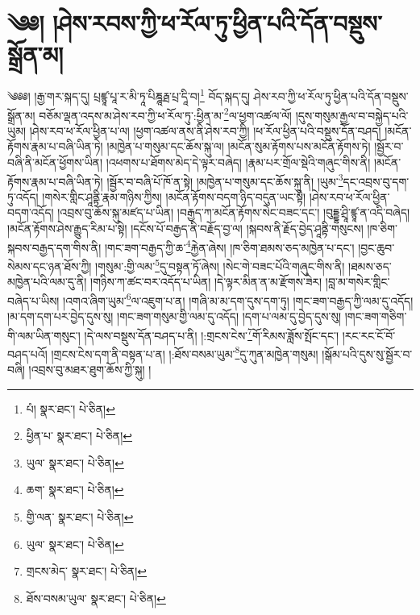 \setcounter{footnote}{0} 
\chapter{༄༅། །ཤེས་རབས་ཀྱི་ཕ་རོལ་ཏུ་ཕྱིན་པའི་དོན་བསྡུས་སྒྲོན་མ།}༄༅༅། །རྒྱ་གར་སྐད་དུ། པྲཛྙཱ་པཱ་ར་མི་ཏཱ་པིཎྜཱརྠ་པྲ་དཱི་བ།\footnote{པཾ།  སྣར་ཐང་།  པེ་ཅིན། } བོད་སྐད་དུ། ཤེས་རབ་ཀྱི་ཕ་རོལ་ཏུ་ཕྱིན་པའི་དོན་བསྡུས་སྒྲོན་མ། བཅོམ་ལྡན་འདས་མ་ཤེས་རབ་ཀྱི་ཕ་རོལ་ཏུ་:ཕྱིན་མ་\footnote{ཕྱིན་པ་  སྣར་ཐང་།  པེ་ཅིན། }ལ་ཕྱག་འཚལ་ལོ། །དུས་གསུམ་རྒྱལ་བ་བསྐྱེད་པའི་ཡུམ། །ཤེས་རབ་ཕ་རོལ་ཕྱིན་པ་ལ། །ཕྱག་འཚལ་ནས་ནི་ཤེས་རབ་ཀྱི། །ཕ་རོལ་ཕྱིན་པའི་བསྡུས་དོན་བཤད། །མངོན་རྟོགས་རྣམ་པ་བཞི་ཡིན་ཏེ། །མཁྱེན་པ་གསུམ་དང་ཆོས་སྐུ་ལ། །མངོན་སུམ་རྟོགས་པས་མངོན་རྟོགས་ཏེ། །སྦྱོར་བ་བཞི་ནི་མངོན་ཕྱོགས་ཡིན། །འཕགས་པ་ཐོགས་མེད་དེ་ལྟར་བཞེད། །རྣམ་པར་གྲོལ་སྡེའི་གཞུང་གིས་ནི། །མངོན་རྟོགས་རྣམ་པ་བཞི་ཡིན་ཏེ། །སྦྱོར་བ་བཞི་པོ་ཁོ་ན་སྟེ། །མཁྱེན་པ་གསུམ་དང་ཆོས་སྐུ་ནི། །ཡུམ་\footnote{ཡུལ་  སྣར་ཐང་།  པེ་ཅིན། }དང་འབྲས་བུ་དག་ཏུ་འདོད། །གསེར་གླིང་ཤཱནྟི་རྣམ་གཉིས་ཀྱིས། །མངོན་རྟོགས་བདག་ཉིད་བདུན་ཡང་སྟེ། །ཤེས་རབ་ཕ་རོལ་ཕྱིན་བདག་འདོད། །འབྲས་བུ་ཆོས་སྐུ་མཛད་པ་ཡིན། །བརྒྱད་ཀ་མངོན་རྟོགས་སེང་བཟང་དང་། །བུདྡྷ་ཤྲཱི་ཛྙཱ་ན་འདི་བཞེད། །མངོན་རྟོགས་ཤེས་རྒྱུད་རིམ་པ་སྟེ། །དངོས་པོ་བརྒྱད་ནི་བརྗོད་བྱ་ལ། །སྐབས་ནི་རྗོད་བྱེད་ཤཱནྟི་གསུངས། །ཁ་ཅིག་སྐབས་བརྒྱད་དག་གིས་ནི། །གང་ཟག་བརྒྱད་ཀྱི་ཆ་\footnote{ཆག་  སྣར་ཐང་།  པེ་ཅིན། }རྐྱེན་ཞེས། །ཁ་ཅིག་ཐམས་ཅད་མཁྱེན་པ་དང་། །བྱང་ཆུབ་སེམས་དང་ཉན་ཐོས་ཀྱི། །གསུམ་:གྱི་ལམ་\footnote{གྱི་ལན་  སྣར་ཐང་།  པེ་ཅིན། }དུ་བསྟན་ཏོ་ཞེས། །སེང་གེ་བཟང་པོའི་གཞུང་གིས་ནི། །ཐམས་ཅད་མཁྱེན་པའི་ལམ་དུ་ནི། །གཉིས་ཀ་ཚང་བར་འདོད་པ་ཡིན། །དེ་ལྟར་མིན་ན་མ་རྫོགས་ཟེར། །བླ་མ་གསེར་གླིང་བཞེད་པ་ཡིས། །འགའ་ཞིག་ཡུམ་\footnote{ཡུལ་  སྣར་ཐང་།  པེ་ཅིན། }ལ་འཇུག་པ་ན། །གཞི་མ་མ་དག་དུས་དག་ཏུ། །གང་ཟག་བརྒྱད་ཀྱི་ལམ་དུ་འདོད། །མ་དག་དག་པར་བྱེད་དུས་སུ། །གང་ཟག་གསུམ་གྱི་ལམ་དུ་འདོད། །དག་པ་ལམ་དུ་བྱེད་དུས་སུ། །གང་ཟག་གཅིག་གི་ལམ་ཡིན་གསུང་། །དེ་ལས་བསྡུས་དོན་བཤད་པ་ནི། །:གྲངས་ངེས་\footnote{གྲངས་མེད་  སྣར་ཐང་།  པེ་ཅིན། }གོ་རིམས་ཟློས་སྤོང་དང་། །རང་རང་ངོ་བོ་བཤད་པའོ། །གྲངས་ངེས་དག་ནི་བསྟན་པ་ན། །:ཐོས་བསམ་ཡུམ་\footnote{ཐོས་བསམ་ཡུལ་  སྣར་ཐང་།  པེ་ཅིན། }དུ་ཀུན་མཁྱེན་གསུམ། །སྒོམ་པའི་དུས་སུ་སྦྱོར་བ་བཞི། །འབྲས་བུ་མཐར་ཐུག་ཆོས་ཀྱི་སྐུ། །

